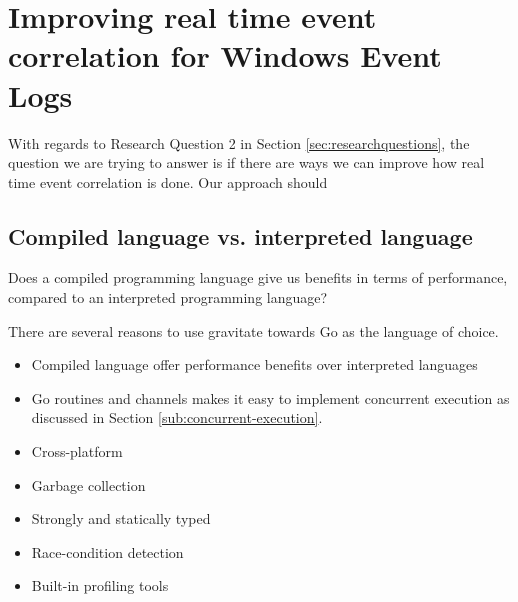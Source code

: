 \section{Improving real time event correlation for Windows Event Logs}
\label{sec:improving-real-time-event-correlation-for-windows-event-logs}

With regards to Research Question 2 in Section \cref{sec:researchquestions}, the question we are trying to answer is if there are ways we can improve how real time event correlation is done. Our approach should 

\subsection{Compiled language vs. interpreted language}
\label{sub:use-compiled-language}

Does a compiled programming language give us benefits in terms of performance, compared to an interpreted programming language?


There are several reasons to use gravitate towards Go as the language of choice.
\begin{itemize}
    \item Compiled language offer performance benefits over interpreted languages
    \item Go routines and channels makes it easy to implement concurrent execution as discussed in Section \cref{sub:concurrent-execution}.
    \item Cross-platform
    \item Garbage collection
    \item Strongly and statically typed
    \item Race-condition detection
    \item Built-in profiling tools
\end{itemize}

